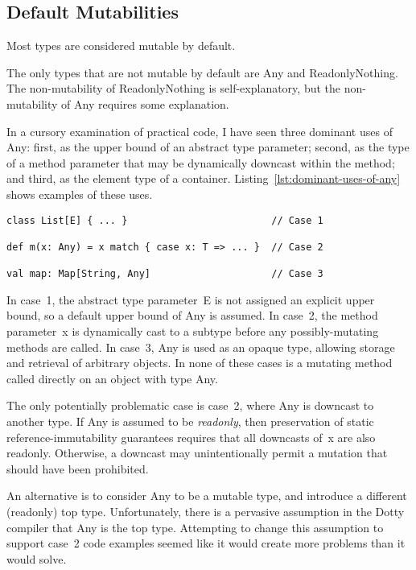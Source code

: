 \subsection{Default Mutabilities} \label{sec:default-mutabilities}

Most types are considered mutable by default.

The only types that are not mutable by default are {\cd Any} and {\cd ReadonlyNothing}.
The non-mutability of {\cd ReadonlyNothing} is self-explanatory, but the non-mutability of {\cd Any} requires some explanation.

In a cursory examination of practical code, I have seen three dominant uses of {\cd Any}: first, as the upper bound of an abstract type parameter; second, as the type of a method parameter that may be dynamically downcast within the method; and third, as the element type of a container. Listing~\ref{lst:dominant-uses-of-any} shows examples of these uses.

\begin{lstlisting}[float=htbp, caption={Dominant Uses of the Any Type}, label={lst:dominant-uses-of-any}]
class List[E] { ... }                         // Case 1

def m(x: Any) = x match { case x: T => ... }  // Case 2

val map: Map[String, Any]                     // Case 3
\end{lstlisting}

In case~1, the abstract type parameter~{\cd E} is not assigned an explicit upper bound, so a default upper bound of {\cd Any} is assumed. In case~2, the method parameter~{\cd x} is dynamically cast to a subtype before any possibly-mutating methods are called. In case~3, {\cd Any} is used as an opaque type, allowing storage and retrieval of arbitrary objects. In none of these cases is a mutating method called directly on an object with type {\cd Any}.

The only potentially problematic case is case~2, where {\cd Any} is downcast to another type.
If {\cd Any} is assumed to be {\em readonly}, then preservation of static reference-immutability guarantees requires that all downcasts of~{\cd x} are also readonly.
Otherwise, a downcast may unintentionally permit a mutation that should have been prohibited.

An alternative is to consider {\cd Any} to be a mutable type, and introduce a different (readonly) top type. Unfortunately, there is a pervasive assumption in the Dotty compiler that {\cd Any} is the top type. Attempting to change this assumption to support case~2 code examples seemed like it would create more problems than it would solve.

